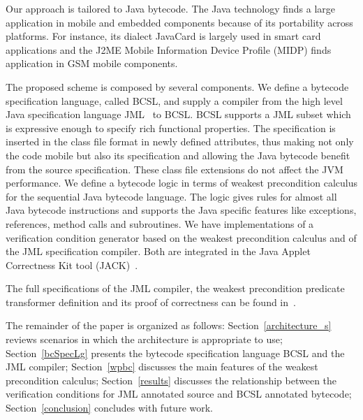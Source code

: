   

Our approach is tailored to Java bytecode.
The Java technology finds a large application in mobile and embedded components because of its portability across platforms. 
For instance, its dialect JavaCard is largely used in smart card applications and the J2ME Mobile Information Device Profile 
(MIDP) finds application in GSM mobile components. 

The proposed scheme is composed by several components.
 We define a bytecode specification language, called BCSL, and supply a compiler from 
 the high level Java specification language JML~\cite{JMLRefMan} to BCSL. 
 BCSL supports a JML subset which is expressive enough to specify rich functional properties. 
The specification is inserted in the class file format in newly defined attributes, thus making not only the code mobile but also its specification
and allowing the Java bytecode benefit from the source specification. These class
 file extensions do not affect the JVM performance.
We define a bytecode logic in terms of weakest precondition calculus for the sequential Java bytecode language. 
The logic gives rules for almost all Java bytecode instructions and supports the Java specific features like 
exceptions, references, method calls and subroutines.  
 We have implementations of a verification condition generator based on the weakest precondition calculus and of
 the JML specification compiler. Both are integrated in the Java Applet Correctness Kit tool (JACK)~\cite{BRL-JACK}.

 
 The full specifications of the JML compiler, the weakest precondition predicate transformer definition and its proof of correctness can be found in~\cite{JBL05MP}.
  
The remainder of the paper is organized as follows: 
Section~\ref{architecture_s} reviews scenarios in which the architecture is appropriate to use; 
 Section~\ref{bcSpecLg} presents the bytecode specification language BCSL and the JML compiler; Section~\ref{wpbc} discusses the main
features of the weakest precondition calculus; Section~\ref{results} discusses the relationship between the verification conditions for JML annotated source and BCSL annotated bytecode; Section~\ref{conclusion} concludes with future work.  















